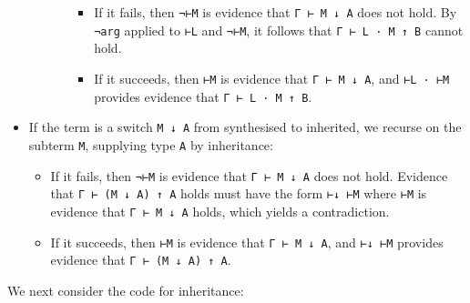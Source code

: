 \begin{itemize}
\begin{itemize}
\begin{itemize}
      \begin{itemize}
      \item
        If it fails, then \texttt{¬⊢M} is evidence that
        \texttt{Γ\ ⊢\ M\ ↓\ A} does not hold. By \texttt{¬arg} applied
        to \texttt{⊢L} and \texttt{¬⊢M}, it follows that
        \texttt{Γ\ ⊢\ L\ ·\ M\ ↑\ B} cannot hold.
      \item
        If it succeeds, then \texttt{⊢M} is evidence that
        \texttt{Γ\ ⊢\ M\ ↓\ A}, and \texttt{⊢L\ ·\ ⊢M} provides evidence
        that \texttt{Γ\ ⊢\ L\ ·\ M\ ↑\ B}.
      \end{itemize}
    \end{itemize}
  \end{itemize}
\item
  If the term is a switch \texttt{M\ ↓\ A} from synthesised to
  inherited, we recurse on the subterm \texttt{M}, supplying type
  \texttt{A} by inheritance:

  \begin{itemize}
  \item
    If it fails, then \texttt{¬⊢M} is evidence that
    \texttt{Γ\ ⊢\ M\ ↓\ A} does not hold. Evidence that
    \texttt{Γ\ ⊢\ (M\ ↓\ A)\ ↑\ A} holds must have the form
    \texttt{⊢↓\ ⊢M} where \texttt{⊢M} is evidence that
    \texttt{Γ\ ⊢\ M\ ↓\ A} holds, which yields a contradiction.
  \item
    If it succeeds, then \texttt{⊢M} is evidence that
    \texttt{Γ\ ⊢\ M\ ↓\ A}, and \texttt{⊢↓\ ⊢M} provides evidence that
    \texttt{Γ\ ⊢\ (M\ ↓\ A)\ ↑\ A}.
  \end{itemize}
\end{itemize}

We next consider the code for inheritance:

